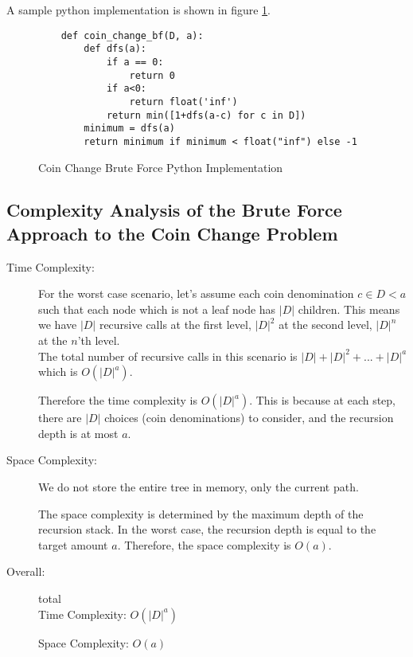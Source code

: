 
A sample python implementation is shown in figure \ref{fig:coin-change-bf}.

\begin{figure}[h]
    \centering
    \begin{lstlisting}
    def coin_change_bf(D, a):
        def dfs(a):
            if a == 0:
                return 0
            if a<0:
                return float('inf')
            return min([1+dfs(a-c) for c in D])
        minimum = dfs(a)
        return minimum if minimum < float("inf") else -1
    \end{lstlisting}
    \caption{Coin Change Brute Force Python Implementation}
    \label{fig:coin-change-bf}
\end{figure}

\subsection{Complexity Analysis of the Brute Force Approach to the Coin Change Problem}

\begin{description}
    \item[Time Complexity:]
    For the worst case scenario, let's assume each coin denomination $c \in D < a$ such that each node which is not a leaf node has $|D|$ children. This means we have $|D|$ recursive calls at the first level, $|D|^{2}$ at the second level, $|D|^{n}$ at the $n$'th level.\\

    The total number of recursive calls in this scenario is $|D| + |D|^{2} + ... + |D|^{a}$ which is $O(|D|^a)$.
    
    Therefore the time complexity is $O(|D|^{a})$. This is because at each step, there are $|D|$ choices (coin denominations) to consider, and the recursion depth is at most $a$.
    
        
    \item[Space Complexity:] 
        We do not store the entire tree in memory, only the current path.

        The space complexity is determined by the maximum depth of the recursion stack. In the worst case, the recursion depth is equal to the target amount $a$. Therefore, the space complexity is $O(a)$.
        
        
    \item[Overall:] total\\
        Time Complexity: $O(|D|^a)$

        Space Complexity: $O(a)$
        
\end{description}

